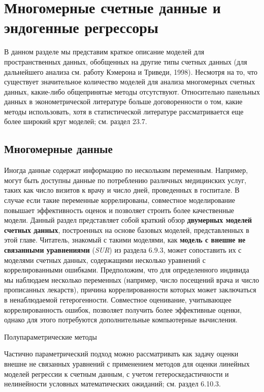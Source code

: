 \section{Многомерные счетные данные и эндогенные регрессоры}\label{sec:20.6}

\noindent
В данном разделе мы представим краткое описание моделей для пространственных данных, обобщенных на другие типы счетных данных (для дальнейшего анализа см. работу Кэмерона и Триведи, 1998). Несмотря на то, что существует значительное количество моделей для анализа многомерных счетных данных, какие-либо общепринятые методы отсутствуют. Относительно панельных данных в эконометрической литературе больше договоренности о том, какие методы использовать, хотя в статистической литературе рассматривается еще более широкий круг моделей; см. раздел 23.7.


\subsection{Многомерные данные}\label{sec:20.6.1}

\noindent
Иногда данные содержат информацию по нескольким переменным. Например, могут быть доступны данные по потреблению различных медицинских услуг, таких как число визитов к врачу и число дней, проведенных в госпитале. В случае если такие переменные коррелированы, совместное моделирование повышает эффективность оценок и позволяет строить более качественные модели. Данный раздел представляет собой краткий обзор \textbf{двумерных моделей счетных данных}, построенных на основе базовых моделей, представленных в этой главе. Читатель, знакомый с такими моделями, как \textbf{модель с внешне не связанными уравнениями} (\textit{SUR}) из раздела 6.9.3, может сопоставить их с моделями счетных данных, содержащими несколько уравнений с коррелированными ошибками. Предположим, что для определенного индивида мы наблюдаем несколько переменных (например, число посещений врача и число прописанных лекарств), причина коррелированности которых может заключаться в ненаблюдаемой гетерогенности. Совместное оценивание, учитывающее коррелированность ошибок, позволяет получить более эффективные оценки, однако для этого потребуются дополнительные компьютерные вычисления.

        \begin{center}{Полупараметрические методы}\end{center}
        \noindent
Частично параметрический подход можно рассматривать как задачу оценки внешне не связанных уравнений с применением методов для оценки линейных моделей регрессии к счетным данным, с учетом гетероскедастичности и нелинейности условных математических ожиданий; см. раздел 6.10.3.

